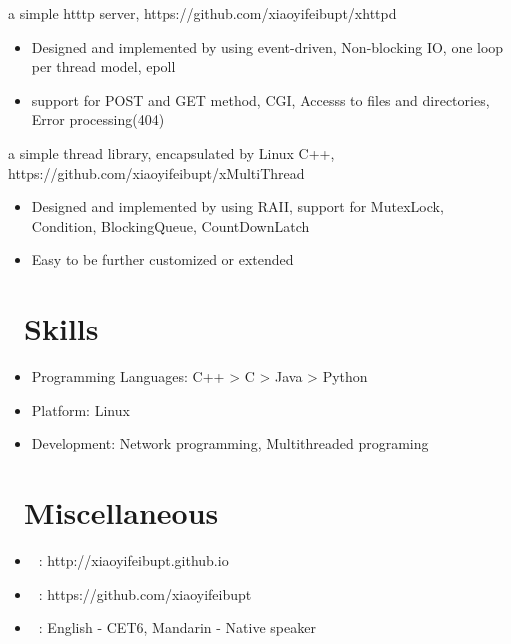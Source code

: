\documentclass{resume}
\begin{document}
a simple htttp server, https://github.com/xiaoyifeibupt/xhttpd
\begin{itemize}
  \item Designed and implemented by using event-driven, Non-blocking IO, one loop per thread model, epoll
  \item support for POST and GET method, CGI, Accesss to files and directories, Error processing(404)
\end{itemize}

a simple thread library, encapsulated by Linux C++, https://github.com/xiaoyifeibupt/xMultiThread
\begin{itemize}
  \item Designed and implemented by using RAII, support for MutexLock, Condition, BlockingQueue, CountDownLatch
  \item Easy to be further customized or extended
\end{itemize}

\section{\faCogs\ Skills}
\begin{itemize}[parsep=0.5ex]
  \item Programming Languages: C++ > C > Java > Python
  \item Platform: Linux
  \item Development: Network programming, Multithreaded programing
\end{itemize}


\section{\faMapsigns\ Miscellaneous}
\begin{itemize}[parsep=0.5ex]
  \item \faHome\ : http://xiaoyifeibupt.github.io
  \item \faGithub\ : https://github.com/xiaoyifeibupt
  \item \faLanguage\ : English - CET6, Mandarin - Native speaker
\end{itemize}
\end{document}
